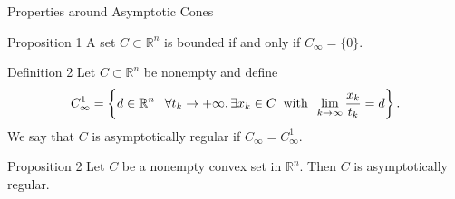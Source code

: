 \documentclass[aspectratio=169, dvipdfmx, 11pt]{beamer} %
\newcommand{\NDemenstionalRealEuclideanSpace}{\mathbb{R}^n}
\begin{document}
\begin{frame}{Properties around Asymptotic Cones}
  \begin{block}{Proposition 1}
    A set $C \subset \mathbb{R}^n$ is bounded if and only if $C_\infty = \{0\}$.
  \end{block}

  \begin{block}{Definition 2}
    Let $C \subset \NDemenstionalRealEuclideanSpace$ be nonempty and define
    \begin{equation}
      C_{\infty}^1 = \left\{d \in \NDemenstionalRealEuclideanSpace \:\middle|\: \forall t_k \rightarrow + \infty , \exists x_k \in C \:\text{ with }\: \lim_{k \to \infty} \frac{x_k}{t_k} = d \right\}. \notag
    \end{equation}
    We say that $C$ is asymptotically regular if $C_{\infty} = C_{\infty}^1$.
  \end{block}

  \begin{block}{Proposition 2}
    Let $C$ be a nonempty convex set in $\NDemenstionalRealEuclideanSpace$. Then $C$ is asymptotically regular.
  \end{block}
\end{frame}
\end{document}
